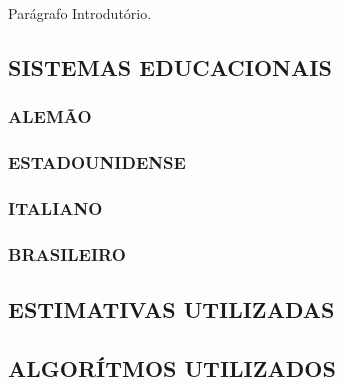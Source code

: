 \documentclass[12pt,a4paper]{article}
\begin{document}
		\par Parágrafo Introdutório.

		\subsection{SISTEMAS EDUCACIONAIS}

			\lipsum[1]

			\subsubsection{ALEMÃO}

				\lipsum[1]

			\subsubsection{ESTADOUNIDENSE}

				\lipsum[1]

			\subsubsection{ITALIANO}

				\lipsum[1]

			\subsubsection{BRASILEIRO}

				\lipsum[1]


		\subsection{ESTIMATIVAS UTILIZADAS}

			\lipsum[1]


		\subsection{ALGORÍTMOS UTILIZADOS}
\end{document}
